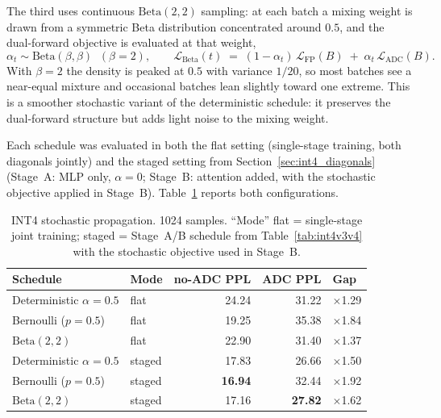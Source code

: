 \documentclass[a4paper,11pt,oneside]{article}
\theoremstyle{breakstyle}
\begin{document}
  The third uses continuous $\mathrm{Beta}(2,2)$ sampling: at each
  batch a mixing weight is drawn from a symmetric Beta distribution
  concentrated around $0.5$, and the dual-forward objective is
  evaluated at that weight,
  \begin{equation}
      \alpha_t \sim \mathrm{Beta}(\beta, \beta) \;\; (\beta = 2),
      \qquad
      \mathcal{L}_{\mathrm{Beta}}(t)
      \;=\;
      (1 - \alpha_t)\,\mathcal{L}_{\mathrm{FP}}(B)
      \;+\;
      \alpha_t\,\mathcal{L}_{\mathrm{ADC}}(B).
  \end{equation}
  With $\beta = 2$ the density is peaked at $0.5$ with variance
  $1/20$, so most batches see a near-equal mixture and occasional
  batches lean slightly toward one extreme.  This is a smoother
  stochastic variant of the deterministic schedule: it preserves
  the dual-forward structure but adds light noise to the mixing
  weight.

  Each schedule was evaluated in both the flat setting
  (single-stage training, both diagonals jointly) and the
  staged setting from Section~\ref{sec:int4_diagonals}
  (Stage~A: MLP only, $\alpha = 0$; Stage~B: attention added, with
  the stochastic objective applied in Stage~B).
  Table~\ref{tab:int4v5} reports both configurations.

  \begin{table}[htbp]
    \centering
    \caption{INT4 stochastic propagation. 1024 samples. ``Mode''
      flat = single-stage joint training; staged = Stage~A/B
      schedule from Table~\ref{tab:int4v3v4} with the stochastic
      objective used in Stage~B.}
    \label{tab:int4v5}
    \renewcommand{\arraystretch}{1.15}
    \begin{tabular}{@{}llrrl@{}}
      \toprule
      \textbf{Schedule} & \textbf{Mode} & \textbf{no-ADC PPL} & \textbf{ADC PPL} & \textbf{Gap} \\
      \midrule
      Deterministic $\alpha=0.5$ & flat   & 24.24 & 31.22 & $\times$1.29 \\
      Bernoulli ($p=0.5$)        & flat   & 19.25 & 35.38 & $\times$1.84 \\
      $\mathrm{Beta}(2,2)$       & flat   & 22.90 & 31.40 & $\times$1.37 \\
      Deterministic $\alpha=0.5$ & staged & 17.83 & 26.66 & $\times$1.50 \\
      Bernoulli ($p=0.5$)        & staged & \textbf{16.94} & 32.44 & $\times$1.92 \\
      $\mathrm{Beta}(2,2)$       & staged & 17.16 & \textbf{27.82} & $\times$1.62 \\
      \bottomrule
    \end{tabular}
  \end{table}
\end{document}
